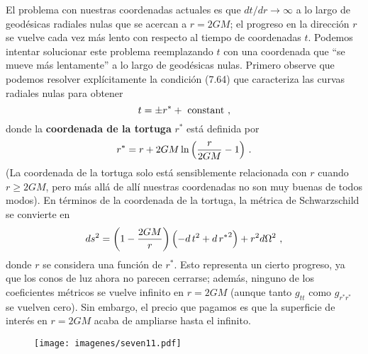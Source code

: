 \documentclass[11pt,b5paper,openany,twoside]{book}
\begin{document}
El problema con nuestras coordenadas actuales es que $dt/dr\rightarrow \infty$ a lo largo de geodésicas radiales nulas que se acercan a $r=2GM$; el progreso en la dirección $r$ se vuelve cada vez más lento con respecto al tiempo de coordenadas $t$.
Podemos intentar solucionar este problema reemplazando $t$ con una coordenada que ``se mueve más lentamente'' a lo largo de geodésicas nulas.
Primero observe que podemos resolver explícitamente la condición (7.64) que caracteriza las curvas radiales nulas para obtener
\begin{equation}
t = \pm r^* +{\rm ~constant}\ ,\label{7.65}
\end{equation}
donde la {\bf coordenada de la tortuga} $r^*$ está definida por
\begin{equation}
r^* = r+2GM \ln\left({{r}\over{2GM}}-1\right)\,.\label{7.66}
\end{equation}
(La coordenada de la tortuga solo está sensiblemente relacionada con $r$ cuando $r\geq 2GM$, pero más allá de allí nuestras coordenadas no son muy buenas de todos modos).
En términos de la coordenada de la tortuga, la métrica de Schwarzschild se convierte en
\begin{equation}
ds^2 = \left(1-{{2GM}\over r}\right)\left(- d\,t^2
+ d\,{r^*}^2 \right) + r^2 d\Omega^2\ ,\label{7.67}
\end{equation}
donde $r$ se considera una función de $r^*$.
Esto representa un cierto progreso, ya que los conos de luz ahora no parecen cerrarse; además, ninguno de los coeficientes métricos se vuelve infinito en $r=2GM$ (aunque tanto $g_{tt}$ como $g_{r^* r^*}$ se vuelven cero).
Sin embargo, el precio que pagamos es que la superficie de interés en $r=2GM$ acaba de ampliarse hasta el infinito.

\begin{figure}[h]
\centering
\texttt{[image: imagenes/seven11.pdf]}
\end{figure}
\end{document}
